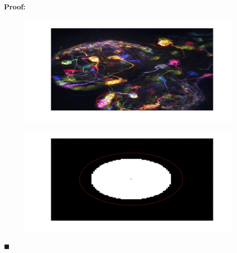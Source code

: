 \documentclass[12pt]{article}
\newenvironment{proof}{\paragraph{Proof: }}{\hfill$\blacksquare$}
\begin{document}
\begin{proof}
\begin{enumerate}
\begin{figure}[H]
\begin{center}
\advance\leftskip-3cm
\advance\rightskip-3cm
\includegraphics[keepaspectratio=true, scale = 0.4]{filtered_brainfly.jpg}
\caption{}
\label{Filtered brainfly}
\end{center}
\end{figure}

\begin{figure}[H]
\begin{center}
\advance\leftskip-3cm
\advance\rightskip-3cm
\includegraphics[keepaspectratio=true, scale = 0.4]{filtered_circle.jpg}
\caption{}
\label{Filtered Circle}
\end{center}
\end{figure}


\end{enumerate}
\end{proof}
\end{document}
